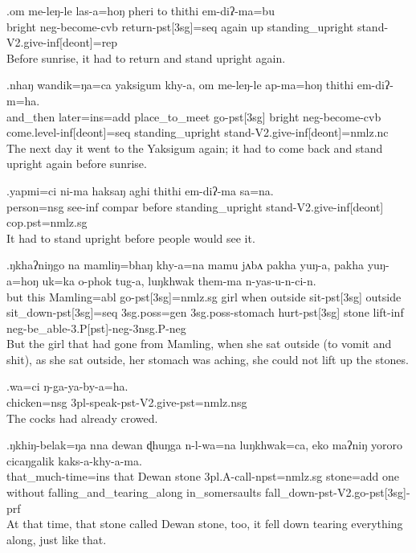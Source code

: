 \exg.om me-leŋ-le las-a=hoŋ   pheri to  thithi  em-diʔ-ma=bu\\
bright {\sc neg-}become{\sc -cvb} return{\sc -pst[3sg]=seq}  again up  standing\_upright stand{\sc -V2.give-inf[deont]=rep}\\
Before sunrise, it had to return and stand  upright again.

\exg.nhaŋ  wandik=ŋa=ca  yaksigum  khy-a, om me-leŋ-le ap-ma=hoŋ   thithi  em-diʔ-m=ha.\\
and\_then later{\sc =ins=add} place\_to\_meet go{\sc -pst[3sg]}  bright {\sc neg-}become{\sc -cvb} come{\sc .level-inf[deont]=seq} standing\_upright  stand{\sc -V2.give-inf[deont]=nmlz.nc}\\
The next day it went to the Yaksigum again; it had to come back and stand upright again before sunrise.

\exg.yapmi=ci ni-ma haksaŋ aghi thithi  em-diʔ-ma    sa=na.\\
person{\sc =nsg} see{\sc -inf} {\sc compar} before standing\_upright stand{\sc -V2.give-inf[deont]} {\sc cop.pst=nmlz.sg}\\
It had to stand upright before people would see it.

\exg.ŋkhaʔniŋgo na mamliŋ=bhaŋ khy-a=na   mamu jʌbʌ pakha yuŋ-a, pakha yuŋ-a=hoŋ  uk=ka  o-phok   tug-a, luŋkhwak them-ma n-yas-u-n-ci-n.\\
but   this Mamling{\sc =abl} go{\sc -pst[3sg]=nmlz.sg} girl when outside sit{\sc -pst[3sg]} outside sit\_down{\sc -pst[3sg]=seq}  {\sc 3sg.poss=gen} {\sc 3sg.poss-}stomach hurt{\sc -pst[3sg]} stone lift{\sc -inf} {\sc neg-}be\_able{\sc -3.P[pst]-neg-3nsg.P-neg}\\
But the girl that had gone from Mamling, when she sat outside (to vomit and shit), as she sat outside, her stomach was aching, she could not lift up the stones.

\exg.wa=ci ŋ-ga-ya-by-a=ha.\\
chicken{\sc =nsg} {\sc 3pl-}speak{\sc -pst-V2.give-pst=nmlz.nsg}\\
The cocks had already crowed.

\exg.ŋkhiŋ-belak=ŋa nna  dewan  ɖhuŋga n-l-wa=na   luŋkhwak=ca, eko maʔniŋ yororo    cicaŋgalik   kaks-a-khy-a-ma.\\
that\_much-time{\sc =ins} that Dewan stone  {\sc 3pl.A-}call{\sc -npst=nmlz.sg} stone{\sc =add} one without  falling\_and\_tearing\_along in\_somersaults fall\_down{\sc -pst-V2.go-pst[3sg]-prf}\\
At that time, that stone called Dewan stone, too, it fell down tearing everything along, just like that.


